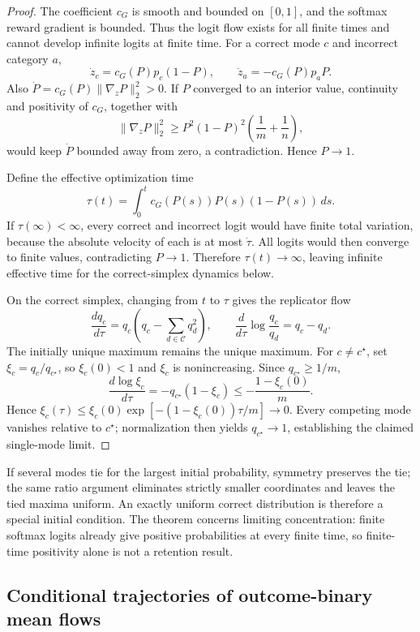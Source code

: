 \begin{proof}
\enforcehalffinalproseline
The coefficient $c_G$ is smooth and bounded on $[0,1]$, and the softmax
reward gradient is bounded. Thus the logit flow exists for all finite times
and cannot develop infinite logits at finite time.
For a correct mode $c$ and incorrect category $a$,
\[
  \dot z_c=c_G(P)p_c(1-P),
  \qquad
  \dot z_a=-c_G(P)p_aP.
\]
Also $\dot P=c_G(P)\lVert\nabla_zP\rVert_2^2>0$. If $P$ converged to an
interior value, continuity and positivity of $c_G$, together with
\[
 \lVert\nabla_zP\rVert_2^2
 \ge P^2(1-P)^2\left(\frac1m+\frac1n\right),
\]
would keep $\dot P$ bounded away from zero, a contradiction. Hence $P\to1$.

Define the effective optimization time
\[
  \tau(t)=\int_0^t c_G(P(s))P(s)(1-P(s))\,ds.
\]
If $\tau(\infty)<\infty$, every correct and incorrect logit would have finite
total variation, because the absolute velocity of each is at most $\dot\tau$.
All logits would then converge to finite values, contradicting $P\to1$.
Therefore $\tau(t)\to\infty$, leaving infinite effective time for the
correct-simplex dynamics below.

On the correct simplex, changing from $t$ to $\tau$ gives the replicator flow
\begin{equation}
  \frac{dq_c}{d\tau}
  =q_c\left(q_c-\sum_{d\in\mathcal C}q_d^2\right),
  \qquad
  \frac{d}{d\tau}\log\frac{q_c}{q_d}=q_c-q_d.
  \label{eq:grpo-replicator}
\end{equation}
The initially unique maximum remains the unique maximum. For $c\ne c^\star$,
set $\xi_c=q_c/q_{c^\star}$, so $\xi_c(0)<1$ and $\xi_c$ is nonincreasing.
Since $q_{c^\star}\ge1/m$,
\[
 \frac{d\log\xi_c}{d\tau}
 =-q_{c^\star}(1-\xi_c)
 \le-\frac{1-\xi_c(0)}{m}.
\]
Hence $\xi_c(\tau)\le\xi_c(0)\exp[-(1-\xi_c(0))\tau/m]\to0$.
Every competing mode vanishes relative to $c^\star$; normalization then
yields $q_{c^\star}\to1$, establishing the claimed single-mode limit.
\end{proof}

If several modes tie for the largest initial probability, symmetry preserves
the tie; the same ratio argument eliminates strictly smaller coordinates and
leaves the tied maxima uniform. An exactly uniform correct distribution is
therefore a special initial condition. The theorem concerns limiting
concentration: finite softmax logits already give positive probabilities at
every finite time, so finite-time positivity alone is not a retention result.

\subsection{Conditional trajectories of outcome-binary mean flows}
\label{app:theory-objective-inertness}

